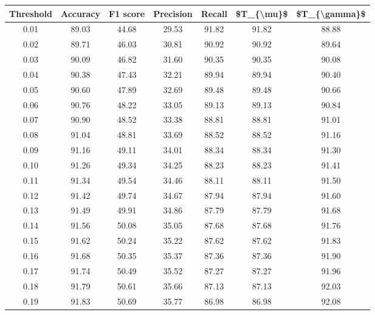 \begin{tabular}{|c|c|c|c|c|c|c|}
\hline
 Threshold &  Accuracy &  F1 score &  Precision &  Recall &  \$T\_\{\textbackslash mu\}\$ &  \$T\_\{\textbackslash gamma\}\$ \\
\hline
      0.01 &     89.03 &     44.68 &      29.53 &   91.82 &      91.82 &         88.88 \\
      0.02 &     89.71 &     46.03 &      30.81 &   90.92 &      90.92 &         89.64 \\
      0.03 &     90.09 &     46.82 &      31.60 &   90.35 &      90.35 &         90.08 \\
      0.04 &     90.38 &     47.43 &      32.21 &   89.94 &      89.94 &         90.40 \\
      0.05 &     90.60 &     47.89 &      32.69 &   89.48 &      89.48 &         90.66 \\
      0.06 &     90.76 &     48.22 &      33.05 &   89.13 &      89.13 &         90.84 \\
      0.07 &     90.90 &     48.52 &      33.38 &   88.81 &      88.81 &         91.01 \\
      0.08 &     91.04 &     48.81 &      33.69 &   88.52 &      88.52 &         91.16 \\
      0.09 &     91.16 &     49.11 &      34.01 &   88.34 &      88.34 &         91.30 \\
      0.10 &     91.26 &     49.34 &      34.25 &   88.23 &      88.23 &         91.41 \\
      0.11 &     91.34 &     49.54 &      34.46 &   88.11 &      88.11 &         91.50 \\
      0.12 &     91.42 &     49.74 &      34.67 &   87.94 &      87.94 &         91.60 \\
      0.13 &     91.49 &     49.91 &      34.86 &   87.79 &      87.79 &         91.68 \\
      0.14 &     91.56 &     50.08 &      35.05 &   87.68 &      87.68 &         91.76 \\
      0.15 &     91.62 &     50.24 &      35.22 &   87.62 &      87.62 &         91.83 \\
      0.16 &     91.68 &     50.35 &      35.37 &   87.36 &      87.36 &         91.90 \\
      0.17 &     91.74 &     50.49 &      35.52 &   87.27 &      87.27 &         91.96 \\
      0.18 &     91.79 &     50.61 &      35.66 &   87.13 &      87.13 &         92.03 \\
      0.19 &     91.83 &     50.69 &      35.77 &   86.98 &      86.98 &         92.08 \\

\end{tabular}
